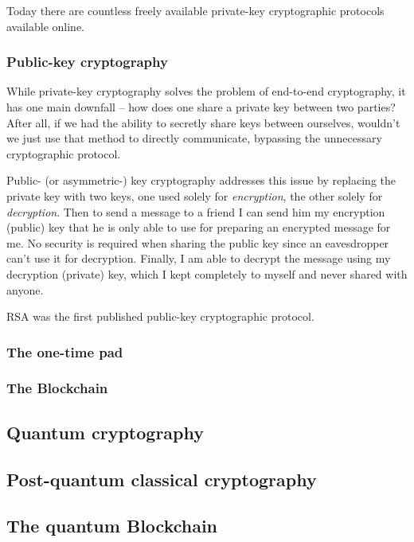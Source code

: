 Today there are countless freely available private-key cryptographic protocols available online. 



\subsubsection{Public-key cryptography}

While private-key cryptography solves the problem of end-to-end cryptography, it has one main downfall -- how does one share a private key between two parties? After all, if we had the ability to secretly share keys between ourselves, wouldn't we just use that method to directly communicate, bypassing the unnecessary cryptographic protocol.

Public- (or asymmetric-) key cryptography addresses this issue by replacing the private key with two keys, one used solely for \textit{encryption}, the other solely for \textit{decryption}. Then to send a message to a friend I can send him my encryption (public) key that he is only able to use for preparing an encrypted message for me. No security is required when sharing the public key since an eavesdropper can't use it for decryption. Finally, I am able to decrypt the message using my decryption (private) key, which I kept completely to myself and never shared with anyone.

RSA \cite{bib:RSA} was the first published public-key cryptographic protocol.

\subsubsection{The one-time pad}

\subsubsection{The Blockchain}

\subsection{Quantum cryptography}

\subsection{Post-quantum classical cryptography}


\subsection{The quantum Blockchain}
